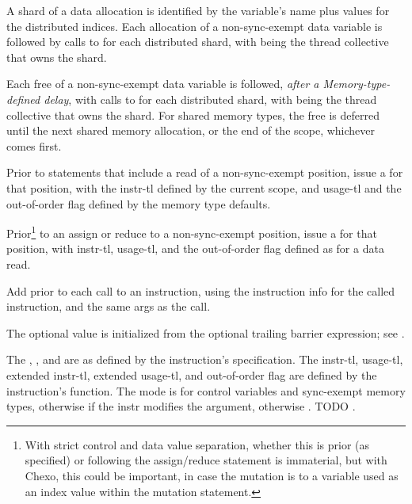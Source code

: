 \filbreak
{} A shard of a data allocation is identified by the variable's name plus values for the distributed indices.
Each allocation of a non-sync-exempt data variable is followed by calls to  for each distributed shard, with  being the thread collective that owns the shard.

\filbreak
{} Each free of a non-sync-exempt data variable is followed, \textit{after a Memory-type-defined delay}, with calls to  for each distributed shard, with  being the thread collective that owns the shard.
For shared memory types, the free is deferred until the next shared memory allocation, or the end of the scope, whichever comes first.

\filbreak
{} Prior to statements that include a read of a non-sync-exempt position, issue a  for that position, with the instr-tl defined by the current scope, and usage-tl and the out-of-order flag defined by the memory type defaults.

\filbreak
{} Prior\footnote{With strict control and data value separation, whether this is prior (as specified) or following the assign/reduce statement is immaterial, but with Chexo, this could be important, in case the mutation is to a variable used as an index value within the mutation statement.}
to an assign or reduce to a non-sync-exempt position, issue a  for that position, with instr-tl, usage-tl, and the out-of-order flag defined as for a data read.

\filbreak
{} Add  prior to each call to an instruction, using the instruction info for the called instruction, and the same args as the call.

The optional  value is initialized from the optional trailing barrier expression; see .

\filbreak
{} The , , and  are as defined by the instruction's  specification.
The instr-tl, usage-tl, extended instr-tl, extended usage-tl, and out-of-order flag are defined by the instruction's  function.
The mode is  for control variables and sync-exempt memory types, otherwise  if the instr modifies the argument, otherwise .
TODO .

